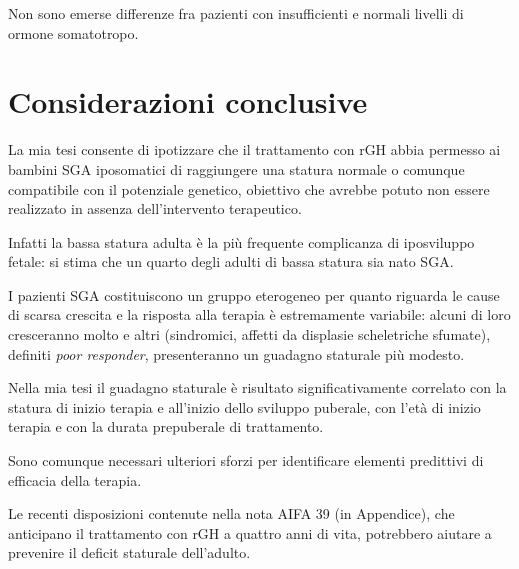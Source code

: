 Non sono emerse differenze fra pazienti con insufficienti e normali livelli di ormone somatotropo.

\chapter{Considerazioni conclusive}

La mia tesi consente di ipotizzare che il trattamento con rGH abbia permesso ai bambini SGA iposomatici di raggiungere una statura normale o comunque compatibile con il potenziale genetico, obiettivo che avrebbe potuto non essere realizzato in assenza dell'intervento terapeutico. 

Infatti la bassa statura adulta è la più frequente complicanza di iposviluppo fetale: si stima che un quarto degli adulti di bassa statura sia nato SGA. 

I pazienti SGA costituiscono un gruppo eterogeneo per quanto riguarda le cause di scarsa crescita e la risposta alla terapia è estremamente variabile:  alcuni di loro cresceranno molto e altri (sindromici, affetti da displasie scheletriche sfumate), definiti \textit{poor responder}\cite{bang2011comparison}, presenteranno un guadagno staturale più modesto.

Nella mia tesi il guadagno staturale è risultato significativamente correlato con la statura di inizio terapia e all'inizio dello sviluppo puberale, con l'età di inizio terapia e con la durata prepuberale di trattamento.

Sono comunque necessari ulteriori sforzi per identificare elementi predittivi di efficacia della terapia.

Le recenti disposizioni contenute nella nota AIFA 39 (in Appendice), che anticipano il trattamento con rGH  a quattro anni di vita, potrebbero aiutare a prevenire il deficit staturale dell'adulto.
